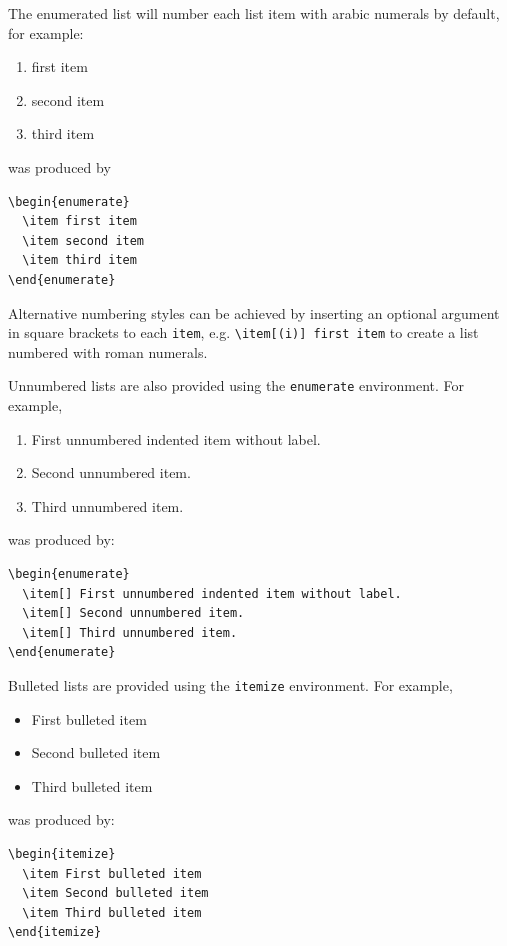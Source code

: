 \documentclass{tATO2e}
\begin{document}
The enumerated list will number each list item with arabic numerals by default, for example:
%
\begin{enumerate}
  \item first item
  \item second item
  \item third item
\end{enumerate}
%
was produced by
%
\begin{verbatim}
\begin{enumerate}
  \item first item
  \item second item
  \item third item
\end{enumerate}
\end{verbatim}
%
Alternative numbering styles can be achieved by inserting an optional argument in square brackets to each \verb"item", e.g. \verb"\item[(i)] first item" to create a list numbered with roman numerals.

Unnumbered lists are also provided using the {\tt enumerate} environment. For example,
%
\begin{enumerate}
  \item[] First unnumbered indented item without label.
  \item[] Second unnumbered item.
  \item[] Third unnumbered item.
\end{enumerate}
%
was produced by:
%
\begin{verbatim}
\begin{enumerate}
  \item[] First unnumbered indented item without label.
  \item[] Second unnumbered item.
  \item[] Third unnumbered item.
\end{enumerate}
\end{verbatim}

Bulleted lists are provided using the {\tt itemize} environment. For example,
%
\begin{itemize}
  \item First bulleted item
  \item Second bulleted item
  \item Third bulleted item
\end{itemize}
%
was produced by:
%
\begin{verbatim}
\begin{itemize}
  \item First bulleted item
  \item Second bulleted item
  \item Third bulleted item
\end{itemize}
\end{verbatim}
\end{document}
